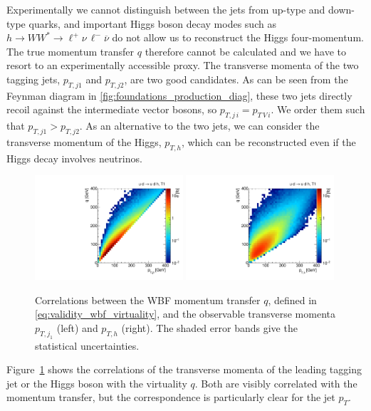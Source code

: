Experimentally we cannot distinguish between the jets from up-type and
down-type quarks, and important Higgs boson decay modes such as
$h \to WW^* \to \ell^+ \nu \, \ell^- \overbar{\nu}$ do not allow us to
reconstruct the Higgs four-momentum. The true momentum transfer $q$
therefore cannot be calculated and we have to resort to an
experimentally accessible proxy. The transverse momenta of the two
tagging jets, $p_{T,j1}$ and $p_{T,j2}$, are two good candidates. As
can be seen from the Feynman diagram in
\autoref{fig:foundations_production_diag}, these two jets directly
recoil against the intermediate vector bosons, so
$p_{T,j\,i} = p_{T \, V \,i}$. We order them such that
$p_{T,j1} > p_{T,j2}$. As an alternative to the two jets, we can
consider the transverse momentum of the Higgs, $p_{T,h}$, which can be
reconstructed even if the Higgs decay involves neutrinos.

\begin{figure}
  \includegraphics[width=0.49\textwidth,clip=true,trim=0 0.2cm 0 0.2cm]{fig/validity/WBF_correl_q_j1pt.pdf}%
  \includegraphics[width=0.49\textwidth,clip=true,trim=0 0.2cm 0 0.2cm]{fig/validity/WBF_correl_q_Hpt.pdf}%
  \caption{Correlations between the WBF momentum transfer $q$, defined
    in \autoref{eq:validity_wbf_virtuality}, and the observable
    transverse momenta $p_{T,j_1}$ (left) and $p_{T,h}$ (right). The
    shaded error bands give the statistical uncertainties.}
  \label{fig:validity_virtuality_correlations}
\end{figure}

Figure~\ref{fig:validity_virtuality_correlations} shows the
correlations of the transverse momenta of the leading tagging jet or
the Higgs boson with the virtuality $q$. Both are visibly correlated
with the momentum transfer, but the correspondence is particularly
clear for the jet $p_T$.

